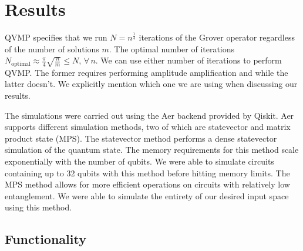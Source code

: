 \documentclass[11pt]{article}
\theoremstyle{definition}
\theoremstyle{remark}
\begin{document}
\section{Results} \label{sec:results}

QVMP specifies that we run $N = n^{\frac{1}{4}}$
iterations of the Grover operator regardless of the number of solutions $m$. The
optimal number of iterations $N_{\text{optimal}} \approx
\frac{\pi}{4}\sqrt{\frac{n}{m}} \leq N,\, \forall \, n$. We can use either
number of iterations to perform QVMP. The former requires performing amplitude
amplification and while the latter doesn't. We explicitly mention which one we
are using when discussing our results.

The simulations were carried out using the Aer backend provided by Qiskit. Aer
supports different simulation methods, two of which are statevector and matrix
product state (MPS). The statevector method performs a dense statevector
simulation of the quantum state. The memory requirements for this method scale
exponentially with the number of qubits. We were able to simulate circuits
containing up to 32 qubits with this method before hitting memory limits. The MPS
method allows for more efficient operations on circuits with relatively low
entanglement. We were able to simulate the entirety of our desired input space
using this method.

\subsection{Functionality}
\end{document}
